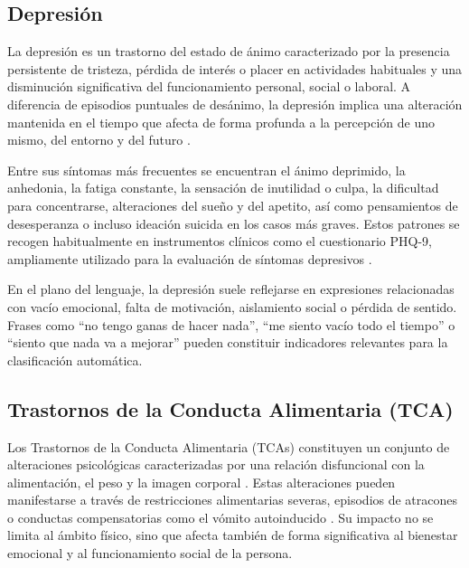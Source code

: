 \subsection{Depresión}

La depresión es un trastorno del estado de ánimo caracterizado por la presencia persistente de tristeza, pérdida de interés o placer en actividades habituales \cite{american_psychiatric_association_diagnostic_2022} y una disminución significativa del funcionamiento personal, social o laboral. A diferencia de episodios puntuales de desánimo, la depresión implica una alteración mantenida en el tiempo que afecta de forma profunda a la percepción de uno mismo, del entorno y del futuro \cite{belloch_manual_2020}.

Entre sus síntomas más frecuentes se encuentran el ánimo deprimido, la anhedonia, la fatiga constante, la sensación de inutilidad o culpa, la dificultad para concentrarse, alteraciones del sueño y del apetito, así como pensamientos de desesperanza o incluso ideación suicida en los casos más graves. Estos patrones se recogen habitualmente en instrumentos clínicos como el cuestionario \ac{PHQ-9}, ampliamente utilizado para la evaluación de síntomas depresivos \cite{kroenke_phq-9_2001}.

En el plano del lenguaje, la depresión suele reflejarse en expresiones relacionadas con vacío emocional, falta de motivación, aislamiento social o pérdida de sentido. Frases como “no tengo ganas de hacer nada”, “me siento vacío todo el tiempo” o “siento que nada va a mejorar” pueden constituir indicadores relevantes para la clasificación automática.

\subsection{Trastornos de la Conducta Alimentaria (TCA)}

Los Trastornos de la Conducta Alimentaria (\acp{TCA}) constituyen un conjunto de alteraciones psicológicas caracterizadas por una relación disfuncional con la alimentación, el peso y la imagen corporal \cite{belloch_manual_2020}. Estas alteraciones pueden manifestarse a través de restricciones alimentarias severas, episodios de atracones o conductas compensatorias como el vómito autoinducido \cite{american_psychiatric_association_diagnostic_2022}. Su impacto no se limita al ámbito físico, sino que afecta también de forma significativa al bienestar emocional y al funcionamiento social de la persona.

